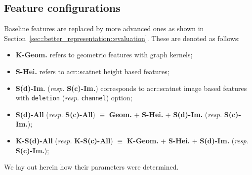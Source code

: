     \subsection{Feature configurations}
        \label{sec::better_representation::implementation::features}
        Baseline features are replaced by more advanced ones as shown in Section~\ref{sec::better_representation::evaluation}.
        These are denoted as follows:
        \begin{itemize}[label=\(\blacktriangleright\)]
            \item \textbf{K-Geom.} refers to geometric features with graph kernels;
            \item \textbf{S-Hei.} refers to \gls{acr::scatnet} height based features;
            \item \textbf{S(d)-Im.} (\textit{resp.} \textbf{S(c)-Im.}) corresponds to \gls{acr::scatnet} image based features with \texttt{deletion} (\textit{resp.} \texttt{channel}) option;
            \item \textbf{S(d)-All} (\textit{resp.} \textbf{S(c)-All}) \(\equiv\) \textbf{Geom.} + \textbf{S-Hei.} + \textbf{S(d)-Im.} (\textit{resp.} \textbf{S(c)-Im.});
            \item \textbf{K-S(d)-All} (\textit{resp.} \textbf{K-S(c)-All}) \(\equiv\) \textbf{K-Geom.} + \textbf{S-Hei.} + \textbf{S(d)-Im.} (\textit{resp.} \textbf{S(c)-Im.});
        \end{itemize}
        We lay out herein how their parameters were determined.
        
